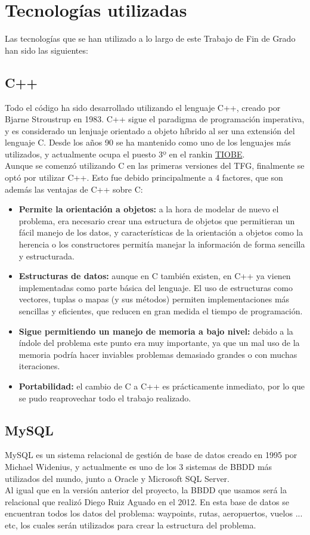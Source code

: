 \chapter{Tecnologías utilizadas}
Las tecnologías que se han utilizado a lo largo de este Trabajo de Fin de Grado han sido las siguientes:

\section{C++}
Todo el código ha sido desarrollado utilizando el lenguaje C++, creado por  Bjarne Stroustrup en 1983. C++ sigue el paradigma de programación imperativa, y es considerado un lenjuaje orientado a objeto híbrido al ser una extensión del lenguaje C. Desde los años 90 se ha mantenido como uno de los lenguajes más utilizados, y actualmente ocupa el puesto 3º en el rankin \href{http://www.tiobe.com/tiobe-index/}{TIOBE}.\\

Aunque se comenzó utilizando C en las primeras versiones del TFG, finalmente se optó por utilizar C++. Esto fue debido principalmente a 4 factores, que son además las ventajas de C++ sobre C:
\begin{itemize}
	\item \textbf{Permite la orientación a objetos: }a la hora de modelar de nuevo el problema, era necesario crear una estructura de objetos que permitieran un fácil manejo de los datos, y características de la orientación a objetos como la herencia o los constructores permitía manejar la información de forma sencilla y estructurada.
	\item \textbf{Estructuras de datos: }aunque en C también existen, en C++ ya vienen implementadas como parte básica del lenguaje. El uso de estructuras como vectores, tuplas o mapas (y sus métodos) permiten implementaciones más sencillas y eficientes, que reducen en gran medida el tiempo de programación.
	\item \textbf{Sigue permitiendo un manejo de memoria a bajo nivel: }debido a la índole del problema este punto era muy importante, ya que un mal uso de la memoria podría hacer inviables problemas demasiado grandes o con muchas iteraciones.
	\item \textbf{Portabilidad:} el cambio de C a C++ es prácticamente inmediato, por lo que se pudo reaprovechar todo el trabajo realizado.
\end{itemize}
                  

\section{MySQL}
MySQL es un sistema relacional de gestión de base de datos creado en 1995 por Michael Widenius, y actualmente es uno de los 3 sistemas de BBDD más utilizados del mundo, junto a Oracle y Microsoft SQL Server.\\
Al igual que en la versión anterior del proyecto, la BBDD que usamos será la relacional que realizó Diego Ruiz Aguado en el 2012. En esta base de datos se encuentran todos los datos del problema: waypoints, rutas, aeropuertos, vuelos ... etc, los cuales serán utilizados para crear la estructura del problema.

